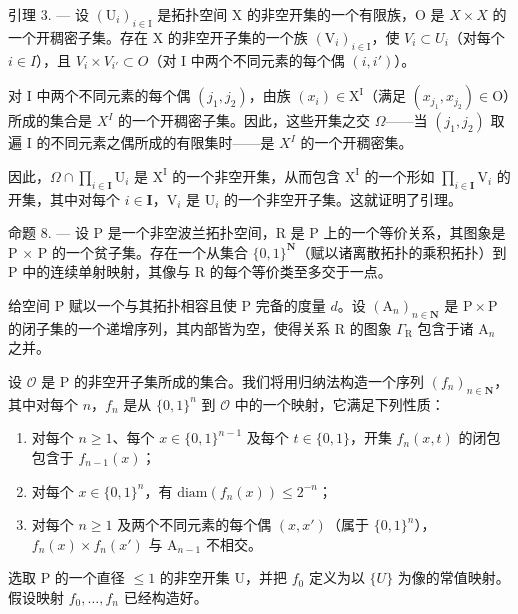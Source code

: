 引理 3. --- 设 \((\mathrm{U}_{i})_{i\in\mathrm{I}}\) 是拓扑空间 X 的非空开集的一个有限族，O 是 \(X\times X\) 的一个开稠密子集。存在 X 的非空开子集的一个族 \((\mathrm{V}_{i})_{i\in\mathrm{I}}\)，使 \(V_{i}\subset U_{i}\)（对每个 \(i\in I\)），且 \(V_{i}\times V_{i'}\subset O\)（对 I 中两个不同元素的每个偶 \((i,i')\)）。

对 I 中两个不同元素的每个偶 \((j_{1}, j_{2})\)，由族 \((x_{i}) \in \mathrm{X}^{\mathrm{I}}\)（满足 \((x_{j_{1}}, x_{j_{2}}) \in \mathrm{O}\)）所成的集合是 \(X^{I}\) 的一个开稠密子集。因此，这些开集之交 \(\Omega\)——当 \((j_{1}, j_{2})\) 取遍 I 的不同元素之偶所成的有限集时——是 \(X^{I}\) 的一个开稠密集。

因此，\(\Omega \cap \prod_{i\in \mathbf{I}}\mathrm{U}_i\) 是 \(\mathrm{X}^{\mathrm{I}}\) 的一个非空开集，从而包含 \(\mathrm{X}^{\mathrm{I}}\) 的一个形如 \(\prod_{i\in \mathbf{I}}\mathrm{V}_i\) 的开集，其中对每个 \(i\in \mathbf{I}\)，\(\mathrm{V}_i\) 是 \(\mathrm{U}_i\) 的一个非空开子集。这就证明了引理。

命题 8. --- 设 P 是一个非空波兰拓扑空间，R 是 P 上的一个等价关系，其图象是 P × P 的一个贫子集。存在一个从集合 \(\{0,1\}^{\mathbf{N}}\)（赋以诸离散拓扑的乘积拓扑）到 P 中的连续单射映射，其像与 R 的每个等价类至多交于一点。

给空间 P 赋以一个与其拓扑相容且使 P 完备的度量 \(d\)。设 \((\mathrm{A}_n)_{n\in \mathbf{N}}\) 是 \(\mathrm{P}\times \mathrm{P}\) 的闭子集的一个递增序列，其内部皆为空，使得关系 R 的图象 \(\Gamma_{\mathrm{R}}\) 包含于诸 \(\mathrm{A}_n\) 之并。

设 \(\mathcal{O}\) 是 P 的非空开子集所成的集合。我们将用归纳法构造一个序列 \((f_n)_{n \in \mathbf{N}}\)，其中对每个 \(n\)，\(f_n\) 是从 \(\{0,1\}^n\) 到 \(\mathcal{O}\) 中的一个映射，它满足下列性质：

\begin{enumerate}
\def\labelenumi{(\roman{enumi})}
\item
  对每个 \(n \geqslant 1\)、每个 \(x \in \{0,1\}^{n-1}\) 及每个 \(t \in \{0,1\}\)，开集 \(f_n(x,t)\) 的闭包包含于 \(f_{n-1}(x)\)；
\item
  对每个 \(x \in \{0,1\}^n\)，有 \(\mathrm{diam}(f_n(x)) \leqslant 2^{-n}\)；
\item
  对每个 \(n \geqslant 1\) 及两个不同元素的每个偶 \((x, x')\)（属于 \(\{0, 1\}^n\)），\(f_n(x) \times f_n(x')\) 与 \(\mathrm{A}_{n-1}\) 不相交。
\end{enumerate}

选取 P 的一个直径 \(\leqslant 1\) 的非空开集 U，并把 \(f_{0}\) 定义为以 \(\{U\}\) 为像的常值映射。假设映射 \(f_{0}, \ldots, f_{n}\) 已经构造好。

